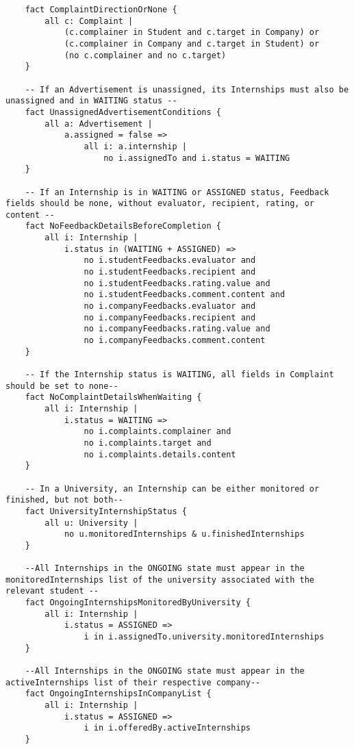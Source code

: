 \begin{lstlisting}
    fact ComplaintDirectionOrNone {
        all c: Complaint |
            (c.complainer in Student and c.target in Company) or
            (c.complainer in Company and c.target in Student) or
            (no c.complainer and no c.target)
    }

    -- If an Advertisement is unassigned, its Internships must also be unassigned and in WAITING status --
    fact UnassignedAdvertisementConditions {
        all a: Advertisement | 
            a.assigned = false =>
                all i: a.internship | 
                    no i.assignedTo and i.status = WAITING
    }
    
    -- If an Internship is in WAITING or ASSIGNED status, Feedback fields should be none, without evaluator, recipient, rating, or content --
    fact NoFeedbackDetailsBeforeCompletion {
        all i: Internship |
            i.status in (WAITING + ASSIGNED) =>
                no i.studentFeedbacks.evaluator and 
                no i.studentFeedbacks.recipient and
                no i.studentFeedbacks.rating.value and
                no i.studentFeedbacks.comment.content and
                no i.companyFeedbacks.evaluator and 
                no i.companyFeedbacks.recipient and
                no i.companyFeedbacks.rating.value and
                no i.companyFeedbacks.comment.content
    }
    
    -- If the Internship status is WAITING, all fields in Complaint should be set to none--
    fact NoComplaintDetailsWhenWaiting {
        all i: Internship |
            i.status = WAITING =>
                no i.complaints.complainer and
                no i.complaints.target and
                no i.complaints.details.content
    }
    
    -- In a University, an Internship can be either monitored or finished, but not both--
    fact UniversityInternshipStatus {
        all u: University |
            no u.monitoredInternships & u.finishedInternships
    }
    
    --All Internships in the ONGOING state must appear in the monitoredInternships list of the university associated with the relevant student --
    fact OngoingInternshipsMonitoredByUniversity {
        all i: Internship |
            i.status = ASSIGNED => 
                i in i.assignedTo.university.monitoredInternships
    }
    
    --All Internships in the ONGOING state must appear in the activeInternships list of their respective company--
    fact OngoingInternshipsInCompanyList {
        all i: Internship |
            i.status = ASSIGNED =>
                i in i.offeredBy.activeInternships
    }
    

\end{lstlisting}
